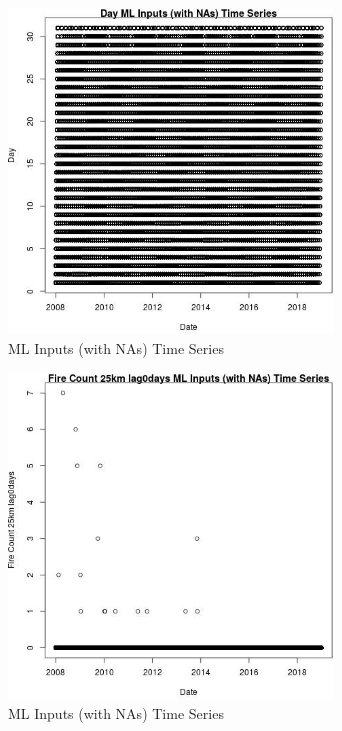 \begin{figure} 
\centering  
\includegraphics[width=0.77\textwidth]{Code_Outputs/Report_ML_input_PM25_Step4_part_e_de_duplicated_aves_compiled_2019-05-21wNAs_DayvDate.jpg} 
\caption{\label{fig:Report_ML_input_PM25_Step4_part_e_de_duplicated_aves_compiled_2019-05-21wNAsDayvDate}ML Inputs (with NAs) Time Series} 
\end{figure} 
 

\begin{figure} 
\centering  
\includegraphics[width=0.77\textwidth]{Code_Outputs/Report_ML_input_PM25_Step4_part_e_de_duplicated_aves_compiled_2019-05-21wNAs_Fire_Count_25km_lag0daysvDate.jpg} 
\caption{\label{fig:Report_ML_input_PM25_Step4_part_e_de_duplicated_aves_compiled_2019-05-21wNAsFire_Count_25km_lag0daysvDate}ML Inputs (with NAs) Time Series} 
\end{figure} 
 

